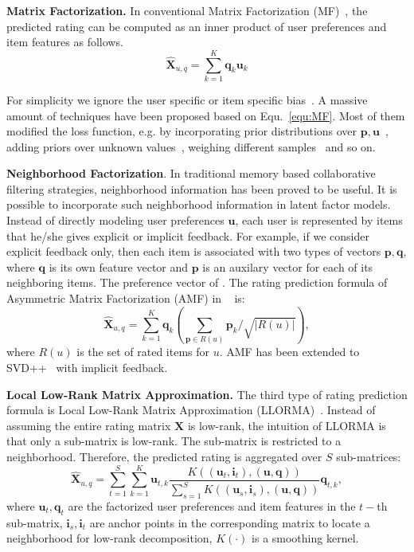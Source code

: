 \documentclass[letterpaper]{article} %
\newcommand{\Rating}{\mathbf{X}}
\begin{document}
\textbf{Matrix Factorization.} In conventional Matrix Factorization (MF)~\cite{Koren2009Matrix}, the predicted rating can be computed as an inner product of user preferences and item features as follows.
\begin{equation}\label{equ:MF}
 \hat{\mathbf{X}}_{u,q}=\sum_{k=1}^{K} \mathbf{q}_k \mathbf{u}_k
\end{equation}

For simplicity we ignore the user specific or item specific bias~\cite{Koren2009Matrix}. A massive amount of techniques have been proposed based on Equ.~\ref{equ:MF}. Most of them modified the loss function, e.g. by incorporating prior distributions over $\mathbf{p},\mathbf{u}$~\cite{salakhutdinov2008probabilistic}, adding priors over unknown values~\cite{Devooght2015Dynamic}, weighing different samples~\cite{Pil'aszy2010Fast} and so on.  

\textbf{Neighborhood Factorization}. In traditional memory based collaborative filtering strategies, neighborhood information has been proved to be useful. It is possible  to incorporate such neighborhood information in latent factor models. Instead of directly modeling user preferences $\mathbf{u}$, each user is represented by items that he/she gives explicit or implicit feedback. For example, if we consider explicit feedback only, then each item is associated with two types of vectors $\mathbf{p},\mathbf{q}$, where $\mathbf{q}$ is its own feature vector and $\mathbf{p}$ is an auxilary vector for each of its neighboring items. The preference vector of . The rating prediction formula of Asymmetric Matrix Factorization (AMF) in ~\cite{Koren2008Factorization} is:  
 \begin{equation}\label{equ:AMF}
\hat{\Rating}_{u,q}=\sum_{k=1}^{K} \mathbf{q}_{k} (\sum_{\mathbf{p} \in R(u)} \mathbf{p}_k/\sqrt{|R(u)|} ),
\end{equation}
where  $R(u)$ is the set of rated items for $u$. AMF has been extended to SVD++~\cite{Koren2008Factorization} with implicit feedback. 

\textbf{Local Low-Rank Matrix Approximation.} The third type of rating prediction formula is  Local Low-Rank Matrix Approximation (LLORMA)~\cite{Lee2016LLORMA}. Instead of assuming the entire rating matrix $\Rating$ is low-rank, the intuition of LLORMA is that only a sub-matrix is low-rank. The sub-matrix is restricted to a neighborhood. Therefore, the predicted rating is aggregated over $S$ sub-matrices:
\begin{equation}\label{equ:LLORMA}
\hat{\Rating}_{u,q} = \sum_{t=1}^{S} \sum_{k=1}^K \mathbf{u}_{t, k} \frac{K((\mathbf{u}_t,\mathbf{i}_t),(\mathbf{u},\mathbf{q}))}{\sum_{s=1}^{S} K((\mathbf{u}_s,\mathbf{i}_s),(\mathbf{u},\mathbf{q}))} \mathbf{q}_{t,k},
\end{equation}
where $\mathbf{u}_t, \mathbf{q}_t$ are the factorized user preferences and item features in the $t-$th sub-matrix,  $\mathbf{i}_s,\mathbf{i}_t$ are anchor points in the corresponding matrix to locate a neighborhood for low-rank decomposition, $K(\cdot)$ is a smoothing kernel. 
\end{document}
